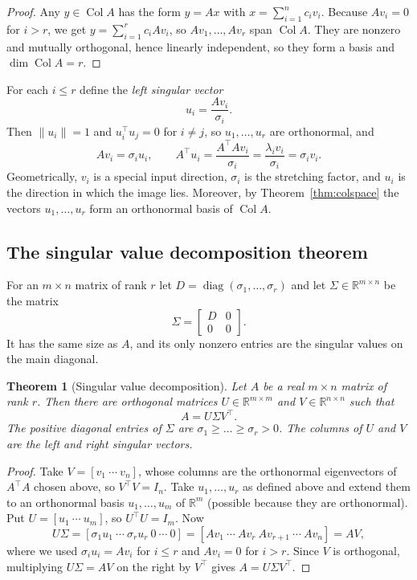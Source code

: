 \documentclass[12pt,a4paper]{report}
\newcommand{\R}{\mathbb{R}}
\newcommand{\norm}[1]{\lVert #1\rVert}
\newcommand{\T}{^{\top}}
\DeclareMathOperator{\Col}{Col}
\DeclareMathOperator{\diag}{diag}
\theoremstyle{plain}
\newtheorem{theorem}{Theorem}[chapter]
\theoremstyle{definition}
\theoremstyle{remark}
\theoremstyle{definition}
\begin{document}
\begin{proof}
Any $y\in\Col A$ has the form $y=Ax$ with $x=\sum_{i=1}^n c_iv_i$. Because $Av_i=0$ for $i>r$, we get $y=\sum_{i=1}^r c_iAv_i$, so $Av_1,\dots,Av_r$ span $\Col A$. They are nonzero and mutually orthogonal, hence linearly independent, so they form a basis and $\dim\Col A=r$.
\end{proof}

For each $i\le r$ define the \emph{left singular vector}
\[
u_i=\frac{Av_i}{\sigma_i}.
\]
Then $\norm{u_i}=1$ and $u_i\T u_j=0$ for $i\ne j$, so $u_1,\dots,u_r$ are orthonormal, and
\begin{equation}\label{eq:pairs}
Av_i=\sigma_iu_i,\qquad A\T u_i=\frac{A\T Av_i}{\sigma_i}=\frac{\lambda_iv_i}{\sigma_i}=\sigma_iv_i .
\end{equation}
Geometrically, $v_i$ is a special input direction, $\sigma_i$ is the stretching factor, and $u_i$ is the direction in which the image lies. Moreover, by Theorem~\ref{thm:colspace} the vectors $u_1,\dots,u_r$ form an orthonormal basis of $\Col A$.

\subsection{The singular value decomposition theorem}

For an $m\times n$ matrix of rank $r$ let $D=\diag(\sigma_1,\dots,\sigma_r)$ and let $\Sigma\in\R^{m\times n}$ be the matrix
\[
\Sigma=\begin{bmatrix} D&0\\0&0\end{bmatrix}.
\]
It has the same size as $A$, and its only nonzero entries are the singular values on the main diagonal.

\begin{theorem}[Singular value decomposition]\label{thm:svd}
Let $A$ be a real $m\times n$ matrix of rank $r$. Then there are orthogonal matrices $U\in\R^{m\times m}$ and $V\in\R^{n\times n}$ such that
\[
A=U\Sigma V\T .
\]
The positive diagonal entries of $\Sigma$ are $\sigma_1\ge\dots\ge\sigma_r>0$. The columns of $U$ and $V$ are the left and right singular vectors.
\end{theorem}

\begin{proof}
Take $V=[v_1\ \cdots\ v_n]$, whose columns are the orthonormal eigenvectors of $A\T A$ chosen above, so $V\T V=I_n$. Take $u_1,\dots,u_r$ as defined above and extend them to an orthonormal basis $u_1,\dots,u_m$ of $\R^m$ (possible because they are orthonormal). Put $U=[u_1\ \cdots\ u_m]$, so $U\T U=I_m$. Now
\[
U\Sigma=[\sigma_1u_1\ \cdots\ \sigma_ru_r\ 0\ \cdots\ 0]=[Av_1\ \cdots\ Av_r\ Av_{r+1}\ \cdots\ Av_n]=AV,
\]
where we used $\sigma_iu_i=Av_i$ for $i\le r$ and $Av_i=0$ for $i>r$. Since $V$ is orthogonal, multiplying $U\Sigma=AV$ on the right by $V\T$ gives $A=U\Sigma V\T$.
\end{proof}
\end{document}
